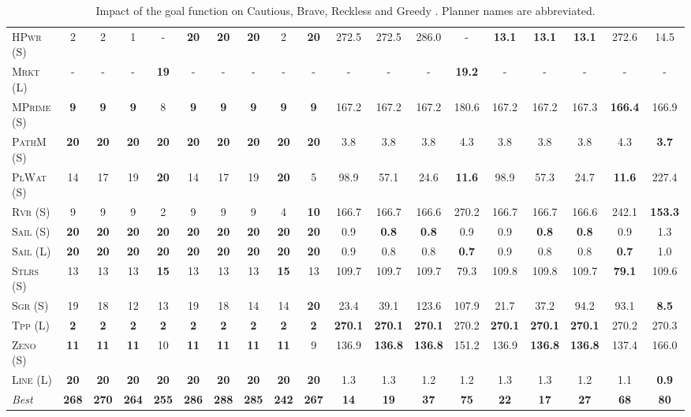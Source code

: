 \begin{table}[tb]
{\begin{tabular}{|l||ccccccccc||ccccccccc||}
\textsc{HPwr} (S)&2&2&1&-&\textbf{20}&\textbf{20}&\textbf{20}&2&\textbf{20}&272.5&272.5&286.0&-&\textbf{13.1}&\textbf{13.1}&\textbf{13.1}&272.6&14.5\\
\textsc{Mrkt} (L)&-&-&-&\textbf{19}&-&-&-&-&-&-&-&-&\textbf{19.2}&-&-&-&-&-\\
\textsc{MPrime} (S)&\textbf{9}&\textbf{9}&\textbf{9}&8&\textbf{9}&\textbf{9}&\textbf{9}&\textbf{9}&\textbf{9}&167.2&167.2&167.2&180.6&167.2&167.2&167.3&\textbf{166.4}&166.9\\
\textsc{PathM} (S)&\textbf{20}&\textbf{20}&\textbf{20}&\textbf{20}&\textbf{20}&\textbf{20}&\textbf{20}&\textbf{20}&\textbf{20}&3.8&3.8&3.8&4.3&3.8&3.8&3.8&4.3&\textbf{3.7}\\
\textsc{PlWat} (S)&14&17&19&\textbf{20}&14&17&19&\textbf{20}&5&98.9&57.1&24.6&\textbf{11.6}&98.9&57.3&24.7&\textbf{11.6}&227.4\\
\textsc{Rvr} (S)&9&9&9&2&9&9&9&4&\textbf{10}&166.7&166.7&166.6&270.2&166.7&166.7&166.6&242.1&\textbf{153.3}\\
\textsc{Sail} (S)&\textbf{20}&\textbf{20}&\textbf{20}&\textbf{20}&\textbf{20}&\textbf{20}&\textbf{20}&\textbf{20}&\textbf{20}&0.9&\textbf{0.8}&\textbf{0.8}&0.9&0.9&\textbf{0.8}&\textbf{0.8}&0.9&1.3\\
\textsc{Sail} (L)&\textbf{20}&\textbf{20}&\textbf{20}&\textbf{20}&\textbf{20}&\textbf{20}&\textbf{20}&\textbf{20}&\textbf{20}&0.9&0.8&0.8&\textbf{0.7}&0.9&0.8&0.8&\textbf{0.7}&1.0\\
\textsc{Stlrs} (S)&13&13&13&\textbf{15}&13&13&13&\textbf{15}&13&109.7&109.7&109.7&79.3&109.8&109.8&109.7&\textbf{79.1}&109.6\\
\textsc{Sgr} (S)&19&18&12&13&19&18&14&14&\textbf{20}&23.4&39.1&123.6&107.9&21.7&37.2&94.2&93.1&\textbf{8.5}\\
\textsc{Tpp} (L)&\textbf{2}&\textbf{2}&\textbf{2}&\textbf{2}&\textbf{2}&\textbf{2}&\textbf{2}&\textbf{2}&\textbf{2}&\textbf{270.1}&\textbf{270.1}&\textbf{270.1}&270.2&\textbf{270.1}&\textbf{270.1}&\textbf{270.1}&270.2&270.3\\
\textsc{Zeno} (S)&\textbf{11}&\textbf{11}&\textbf{11}&10&\textbf{11}&\textbf{11}&\textbf{11}&\textbf{11}&9&136.9&\textbf{136.8}&\textbf{136.8}&151.2&136.9&\textbf{136.8}&\textbf{136.8}&137.4&166.0\\
\textsc{Line} (L)&\textbf{20}&\textbf{20}&\textbf{20}&\textbf{20}&\textbf{20}&\textbf{20}&\textbf{20}&\textbf{20}&\textbf{20}&1.3&1.3&1.2&1.2&1.3&1.3&1.2&1.1&\textbf{0.9}
\\\hline
\textit{Best}&\textbf{268}&\textbf{270}&\textbf{264}&\textbf{255}&\textbf{286}&\textbf{288}&\textbf{285}&\textbf{242}&\textbf{267}&\textbf{14}&\textbf{19}&\textbf{37}&\textbf{75}&\textbf{22}&\textbf{17}&\textbf{27}&\textbf{68}&\textbf{80}\\\hline

        \end{tabular}}
        \caption{Impact of the goal function on Cautious, Brave, Reckless and Greedy \pattyd. Planner names are abbreviated.}
        \label{tab:abl-gf}
        \end{table}
        